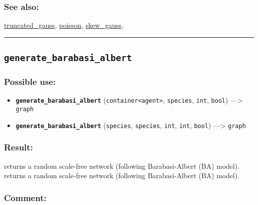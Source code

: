 \documentclass[]{book}
\providecommand{\tightlist}{%
  \setlength{\itemsep}{0pt}\setlength{\parskip}{0pt}}
\theoremstyle{definition}
\theoremstyle{definition}
\theoremstyle{definition}
\theoremstyle{remark}
\begin{document}
\subsubsection{See also:}\label{see-also-102}

\href{OperatorsSZ\#truncated_gauss}{truncated\_gauss},
\href{OperatorsNR\#poisson}{poisson},
\href{OperatorsSZ\#skew_gauss}{skew\_gauss},

\begin{center}\rule{0.5\linewidth}{\linethickness}\end{center}

\subsection{\texorpdfstring{\texttt{generate\_barabasi\_albert}}{generate\_barabasi\_albert}}\label{generate_barabasi_albert}

\subsubsection{Possible use:}\label{possible-use-186}

\begin{itemize}
\tightlist
\item
  \textbf{\texttt{generate\_barabasi\_albert}}
  (\texttt{container\textless{}agent\textgreater{}}, \texttt{species},
  \texttt{int}, \texttt{bool}) ---\textgreater{} \texttt{graph}
\item
  \textbf{\texttt{generate\_barabasi\_albert}} (\texttt{species},
  \texttt{species}, \texttt{int}, \texttt{int}, \texttt{bool})
  ---\textgreater{} \texttt{graph}
\end{itemize}

\subsubsection{Result:}\label{result-180}

returns a random scale-free network (following Barabasi-Albert (BA)
model). returns a random scale-free network (following Barabasi-Albert
(BA) model).

\subsubsection{Comment:}\label{comment-40}
\end{document}
